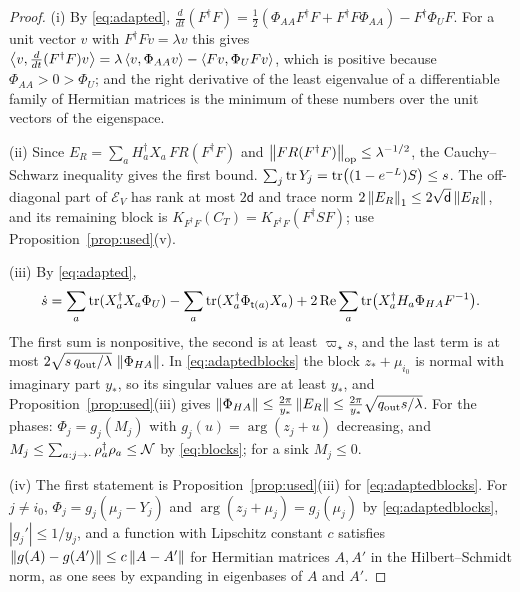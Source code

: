\begin{proof}
(i) By \eqref{eq:adapted},
$\frac d{dt}(F^\dagger F)=\frac12(\Phi_{AA}F^\dagger F+F^\dagger F\Phi_{AA})-F^\dagger\Phi_UF$.
For a unit vector $v$ with $F^\dagger Fv=\lambda v$ this gives
$\left\langle v,\frac d{dt}(F^\dagger F)v\right\rangle=\lambda\left\langle v,\Phi_{AA}v\right\rangle-\left\langle Fv,\Phi_UFv\right\rangle$,
which is positive because $\Phi_{AA}>0>\Phi_U$; and the right derivative of
the least eigenvalue of a differentiable family of Hermitian matrices is the
minimum of these numbers over the unit vectors of the eigenspace.

(ii) Since $E_R=\sum_aH_a^\dagger X_a\,FR(F^\dagger F)$ and
$\left\lVert FR(F^\dagger F)\right\rVert_{\mathrm{op}}\leq\lambda^{-1/2}$, the Cauchy--Schwarz
inequality gives the first bound. $\sum_j\operatorname{tr} Y_j=\operatorname{tr}\bigl((1-e^{-L})S\bigr)\leq s$.
The off-diagonal part of $\mathcal E_V$ has rank at most $2\mathsf d$ and
trace norm $2\left\lVert E_R\right\rVert_1\leq2\sqrt{\mathsf d}\left\lVert E_R\right\rVert$, and its remaining
block is $K_{F^\dagger F}(C_T)=K_{F^\dagger F}(F^\dagger SF)$; use
Proposition~\ref{prop:used}(v).

(iii) By \eqref{eq:adapted},
\[
 \dot s=\sum_a\operatorname{tr}(X_a^\dagger X_a\Phi_U)-\sum_a\operatorname{tr}(X_a^\dagger\Phi_{\mathsf t(a)}X_a)
 +2\operatorname{Re}\sum_a\operatorname{tr}\bigl(X_a^\dagger H_a\Phi_{HA}F^{-1}\bigr).
\]
The first sum is nonpositive, the second is at least $\varpi_\star s$, and the last
term is at most $2\sqrt{s\,q_{\mathrm{out}}/\lambda}\,\left\lVert\Phi_{HA}\right\rVert$. In
\eqref{eq:adaptedblocks} the block $z_\ast+\mu_{i_0}$ is normal with
imaginary part $y_\ast$, so its singular values are at least $y_\ast$, and
Proposition~\ref{prop:used}(iii) gives
$\left\lVert\Phi_{HA}\right\rVert\leq\frac{2\pi}{y_\ast}\left\lVert E_R\right\rVert\leq\frac{2\pi}{y_\ast}\sqrt{q_{\mathrm{out}}s/\lambda}$.
For the phases: $\Phi_j=g_j(M_j)$ with $g_j(u)=\arg(z_j+u)$ decreasing, and
$M_j\leq\sum_{a:j\to\cdot}\rho_a^\dagger\rho_a\leq\mathcal N$ by \eqref{eq:blocks};
for a sink $M_j\leq0$.

(iv) The first statement is Proposition~\ref{prop:used}(iii) for
\eqref{eq:adaptedblocks}. For $j\neq i_0$, $\Phi_j=g_j(\mu_j-Y_j)$ and
$\arg(z_j+\mu_j)=g_j(\mu_j)$ by \eqref{eq:adaptedblocks}, $|g_j'|\leq1/y_j$, and a
function with Lipschitz constant $c$ satisfies
$\left\lVert g(A)-g(A')\right\rVert\leq c\left\lVert A-A'\right\rVert$ for Hermitian matrices $A,A'$ in the
Hilbert--Schmidt norm, as one sees by expanding in eigenbases of $A$ and
$A'$.


\end{proof}
